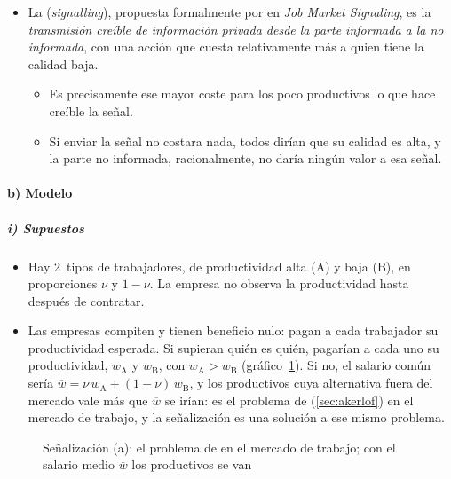 \documentclass[11pt]{article}
\begin{document}
\begin{itemize}
\item La  (\emph{signalling}), propuesta formalmente por \textcite{Spence1973Job} en \emph{Job Market Signaling}, es la \emph{transmisión creíble de información privada desde la parte informada a la no informada}, con una acción que cuesta relativamente más a quien tiene la calidad baja.
  \begin{itemize}
  \item Es precisamente ese mayor coste para los poco productivos lo que hace creíble la señal.
  \item Si enviar la señal no costara nada, todos dirían que su calidad es alta, y la parte no informada, racionalmente, no daría ningún valor a esa señal.
  \end{itemize}
\end{itemize}

\paragraph{b) Modelo}

\subparagraph{i) Supuestos}

\begin{itemize}
\item Hay 2~tipos de trabajadores, de productividad alta ($\mathrm{A}$) y baja ($\mathrm{B}$), en proporciones $\nu$ y $1-\nu$. La empresa no observa la productividad hasta después de contratar.
\item Las empresas compiten y tienen beneficio nulo: pagan a cada trabajador su productividad esperada. Si supieran quién es quién, pagarían a cada uno su productividad, $w_{\mathrm{A}}$ y $w_{\mathrm{B}}$, con $w_{\mathrm{A}}>w_{\mathrm{B}}$ (gráfico~\ref{fig:spence-a}). Si no, el salario común sería $\overline{w}=\nu\,w_{\mathrm{A}}+(1-\nu)\,w_{\mathrm{B}}$, y los productivos cuya alternativa fuera del mercado vale más que $\overline{w}$ se irían: es el problema de  (\ref{sec:akerlof}) en el mercado de trabajo, y la señalización es una solución a ese mismo problema.
\end{itemize}

\begin{figure}[H]
\centering
\caption{Señalización (a): el problema de  en el mercado de trabajo; con el salario medio $\overline{w}$ los productivos se van}\label{fig:spence-a}
\end{figure}
\end{document}
